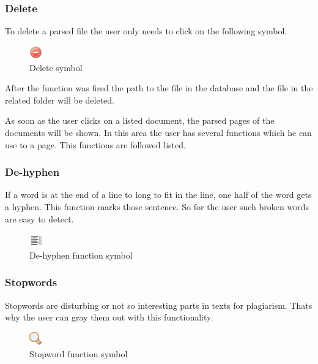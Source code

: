 \subsubsection{Delete}

To delete a parsed file the user only needs to click on the following symbol.

\begin{figure}[!ht]
  \centering
    \includegraphics[width=0.05\textwidth]{images/delete.png}
  \caption{Delete symbol}
  \label{fig:delete symbol}
\end{figure}

After the function was fired the path to the file in the database and the file in the related folder will be deleted.
\minisec{}

As soon as the user clicks on a listed document, the parsed pages of the documents will be shown. In this area the user has several functions which he can use to a page. This functions are followed listed.

\subsubsection{De-hyphen}
If a word is at the end of a line to long to fit in the line, one half of the word gets a hyphen. This function marks those sentence. So for the user such broken words are easy to detect.
\begin{figure}[!ht]
  \centering
    \includegraphics[width=0.05\textwidth]{images/basic_functionalities/text_padding_right.png}
  \caption{De-hyphen function symbol}
  \label{fig:De-hyphen function symbol}
\end{figure}

\subsubsection{Stopwords}
Stopwords are disturbing or not so interesting parts in texts for plagiarism. Thats why the user can gray them out with this functionality.
\begin{figure}[!ht]
  \centering
    \includegraphics[width=0.05\textwidth]{images/basic_functionalities/zoom.png}
  \caption{Stopword function symbol}
  \label{fig:stopword function symbol}
\end{figure}


